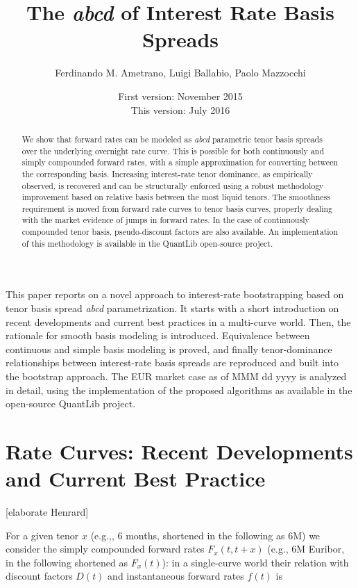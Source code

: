 \documentclass{article}
\title{The \textit{abcd} of Interest Rate Basis Spreads}
\author{Ferdinando M. Ametrano, Luigi Ballabio, Paolo Mazzocchi}
\date{First version: November 2015\\
      This version: July 2016}
\begin{document}
\maketitle

\begin{abstract}
    We show that forward rates can be modeled as \textit{abcd} parametric tenor basis spreads over the underlying overnight rate curve. This is possible for both continuously and simply compounded forward rates, with a simple approximation for converting between the corresponding basis. Increasing interest-rate tenor dominance, as empirically observed, is recovered and can be structurally enforced using a robust methodology improvement based on relative basis between the most liquid tenors. The smoothness requirement is moved from forward rate curves to tenor basis curves, properly dealing with the market evidence of jumps in forward rates. In the case of continuously compounded tenor basis, pseudo-discount factors are also available. An implementation of this methodology is available in the QuantLib open-source project.
\end{abstract}






\noindent
This paper reports on a novel approach to interest-rate bootstrapping based on tenor basis spread \textit{abcd} parametrization.
It starts with a short introduction on recent developments and current best practices in a multi-curve world. Then, the rationale for smooth basis modeling is introduced. Equivalence between continuous and simple basis modeling is proved, and finally tenor-dominance relationships between interest-rate basis spreads are reproduced and built into the bootstrap approach. The EUR market case as of MMM dd yyyy is analyzed in detail, using the implementation of the proposed algorithms as available in the open-source QuantLib \cite{QuantLib} project.









\section{Rate Curves: Recent Developments and Current Best Practice}

[elaborate Henrard]

For a given tenor $x$ (e.g.,, 6 months, shortened in the following as 6M) we consider the simply compounded forward rates $F_x(t, t+x)$ (e.g., 6M Euribor, in the following shortened as $F_x(t)$): in a single-curve world their relation with discount factors $D(t)$ and instantaneous forward rates $f(t)$ is
\end{document}
